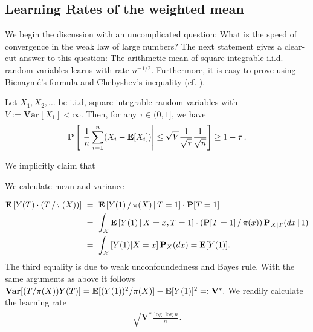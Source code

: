 

\subsection{Learning Rates of the weighted mean}

We begin the discussion with an
uncomplicated question:
What is the speed of convergence in the weak law of large numbers?
The next statement gives a clear-cut answer to this question:
The arithmetic mean of square-integrable i.i.d. random variables 
learns with rate $n^{-1/2}$.
Furthermore, it is easy to prove using
Bienaymé's formula and Chebyshev's inequality (cf. \cite[Theorem~5.14]{Klenke2020}).


\begin{theorem*}
  Let 
  $
    X_1,X_2,\ldots
  $
  be i.i.d, square-integrable random variables with 
  $
    V:=
    \mathbf{Var}[X_1]
    <\infty
  $.
  Then, for any $\tau \in (0,1]$, we have
  \begin{gather}
   \mathbf{P}
   \left[
     \left| 
   \frac{1}{n}
   \sum_{i=1}^{n}
   (X_i - \mathbf{E}[X_i])
     \right|
     \le
     \sqrt{V}
     \frac{1}{\sqrt{\tau}}
     \frac{1}{\sqrt{n}}
   \right]
   \ge
   1-\tau\,.
  \end{gather}
\end{theorem*}

We implicitly claim that 


We calculate mean and variance

\begin{align}
  \begin{split}
  \E
  \left[ 
    Y(T)
    \cdot
    (T\,/\,\pi(X))
  \right]
  &\ =\ 
  \E
  \left[ 
    Y(1)
    \,
    /
    \,
    \pi(X)
    \,
    \vert
    \,
    T=1
  \right]
  \cdot
  \P[T=1]
  \\
  &\ =\ 
  \int_\mathcal{X}
  \E
  \left[ 
    Y(1)
    \,
    \vert
    \,
    X=x
    ,
    T=1
  \right]
  \cdot
  (
  \P[T=1]
  \,
  /
  \,
  \pi(x)
  )
  \,
  \P_{X|T}(dx\,|\,1)
  \\
  &\ =\ 
  \int_\mathcal{X}
  \left[ 
    Y(1)
    \vert
    X=x
  \right]
  \P_X(dx)
  =
  \E[Y(1)]
  .
\end{split}
\end{align}
The third equality is due to weak unconfoundedness and Bayes rule.
With the same arguments as above it follows
$
  \mathbf{Var}
  [
    (T/\pi(X))
    Y(T)
  ]
    =
    \mathbf{E}[
    (Y(1))^2
    /
    \pi(X)
    ]
    -
    \mathbf{E}[Y(1)]^2
    =:
    \mathbf{V}^*
    .
$
We readily calculate the learning rate 
\begin{gather}
  \sqrt{
    \mathbf{V}^*
    \frac{\log\log n}{n}
  }
  .
\end{gather}

